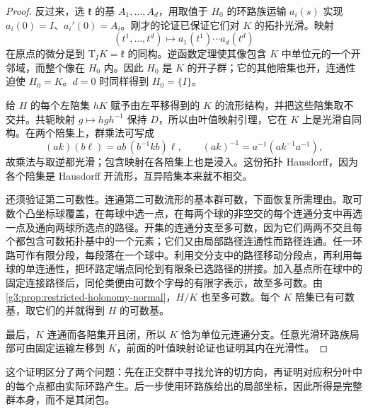 \begin{proof}
	反过来，选 \(\mathfrak k\) 的基 \(A_1,\ldots,A_d\)，用取值于 \(H_0\) 的环路族运输 \(a_i(s)\) 实现 \(a_i(0)=I\)、\(a_i'(0)=A_i\)。刚才的论证已保证它们对 \(K\) 的拓扑光滑。映射
	\[
		(t^1,\ldots,t^d)\longmapsto a_1(t^1)\cdots a_d(t^d)
	\]
	在原点的微分是到 \(\mathrm T_IK=\mathfrak k\) 的同构。逆函数定理使其像包含 \(K\) 中单位元的一个开邻域，而整个像在 \(H_0\) 内。因此 \(H_0\) 是 \(K\) 的开子群；它的其他陪集也开，连通性迫使 \(H_0=K\)。\(d=0\) 时同样得到 \(H_0=\{I\}\)。

	给 \(H\) 的每个左陪集 \(hK\) 赋予由左平移得到的 \(K\) 的流形结构，并把这些陪集取不交并。共轭映射 \(g\mapsto hgh^{-1}\) 保持 \(D\)，所以由叶值映射引理，它在 \(K\) 上是光滑自同构。在两个陪集上，群乘法可写成
	\[
		(ak)(b\ell)=ab\,(b^{-1}kb)\ell,
		\qquad (ak)^{-1}=a^{-1}(ak^{-1}a^{-1}),
	\]
	故乘法与取逆都光滑；包含映射在各陪集上也是浸入。这份拓扑 Hausdorff，因为各个陪集是 Hausdorff 开流形，互异陪集本来就不相交。

	还须验证第二可数性。连通第二可数流形的基本群可数，下面恢复所需理由。取可数个凸坐标球覆盖，在每球中选一点，在每两个球的非空交的每个连通分支中再选一点及通向两球所选点的路径。开集的连通分支至多可数，因为它们两两不交且每个都包含可数拓扑基中的一个元素；它们又由局部路径连通性而路径连通。任一环路可作有限分段，每段落在一个球中。利用交分支中的路径移动分段点，再利用每球的单连通性，把环路定端点同伦到有限条已选路径的拼接。加入基点所在球中的固定连接路径后，同伦类便由可数个字母的有限字表示，故至多可数。由\cref{g3:prop:restricted-holonomy-normal}，\(H/K\) 也至多可数。每个 \(K\) 陪集已有可数基，取它们的并就得到 \(H\) 的可数基。

	最后，\(K\) 连通而各陪集开且闭，所以 \(K\) 恰为单位元连通分支。任意光滑环路族局部可由固定运输左移到 \(K\)，前面的叶值映射论证也证明其内在光滑性。
\end{proof}

这个证明区分了两个问题：先在正交群中寻找允许的切方向，再证明对应积分叶中的每个点都由实际环路产生。后一步使用环路族给出的局部坐标，因此所得是完整群本身，而不是其闭包。

